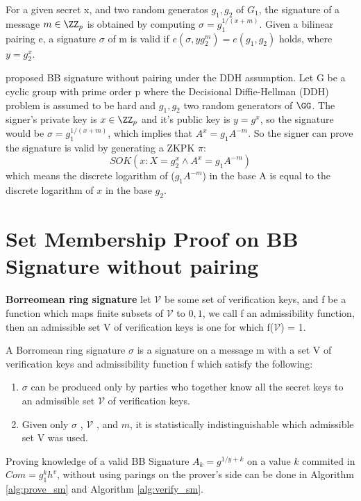 For a given secret x, and two random generatos $g_1, g_2$ of $G_1$, the signature of a message $m \in \ZZ_p$ is obtained by computing $\sigma = g_1^{1/(x+m)}$. Given a bilinear pairing e, a signature $\sigma$ of m is valid if $e(\sigma, yg_2^m) = e(g_1, g_2)$ holds, where $y = g_2^x$.

\cite{arfaoui2015practical} proposed BB signature without pairing under the DDH assumption. Let G be a cyclic group with prime order p where the
Decisional Diffie-Hellman (DDH) problem is assumed to be hard and $g_1, g_2$ two random generators of $\GG$. The signer’s private key is $x \in \ZZ_p$ and it's public key is $y = g^x$, so the signature would be $\sigma = g_1^{1/(x+m)}$, which implies that $A^x = g_1 A^{-m}$. So the signer can prove the signature is valid by generating a ZKPK $\pi$:
\begin{equation}
    SOK(x: X = g_2^x \land A^x = g_1A^{-m})
\end{equation}
which means the discrete logarithm of ($g_1 A^{-m}$) in the base A is equal to the discrete logarithm of $x$ in the base $g_2$.

\section{Set Membership Proof on BB Signature without pairing}

\begin{myDef}
\label{d5}
\textbf{Borreomean ring signature\cite{maxwell2015borromean}} let $\mathcal{V}$ be some set of verification keys, and f be a function which maps finite subsets of $\mathcal{V}$ to ${0, 1}$, we call f an admissibility function, then an admissible set V of verification keys is one for which f($\mathcal{V}$) = 1. 

A Borromean ring signature $\sigma$ is a signature on a message m with a set V of verification keys and admissibility function f which satisfy the following:
\begin{enumerate}
    \item $\sigma$ can be produced only by parties who together know all the secret keys to an admissible set $\mathcal{V}$ of verification keys.
    \item Given only $\sigma$ , $\mathcal{V}$ , and $m$, it is statistically indistinguishable which admissible set V was used.
\end{enumerate}
\end{myDef}

Proving knowledge of a valid BB Signature $A_k = g^{1/{y+k}}$ on a value $k$ commited in $Com = g_1^k h^v$, without using parings on the prover's side can be done in Algorithm \ref{alg:prove_sm} and Algorithm \ref{alg:verify_sm}. 

